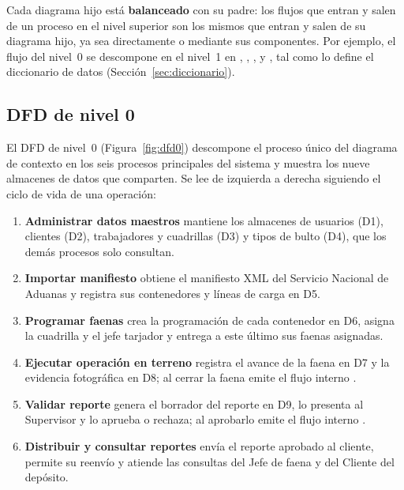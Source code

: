 Cada diagrama hijo está \textbf{balanceado} con su padre: los flujos que entran y salen de un
proceso en el nivel superior son los mismos que entran y salen de su diagrama hijo, ya sea
directamente o mediante sus componentes. Por ejemplo, el flujo 
del nivel~0 se descompone en el nivel~1 en , ,
,  y , tal como
lo define el diccionario de datos (Sección~\ref{sec:diccionario}).

\subsection{DFD de nivel 0}
\label{sec:dfd0}

El DFD de nivel~0 (Figura~\ref{fig:dfd0}) descompone el proceso único del diagrama de contexto
en los seis procesos principales del sistema y muestra los nueve almacenes de datos que
comparten. Se lee de izquierda a derecha siguiendo el ciclo de vida de una operación:

\begin{enumerate}
    \item \textbf{Administrar datos maestros} mantiene los almacenes de usuarios (D1), clientes
    (D2), trabajadores y cuadrillas (D3) y tipos de bulto (D4), que los demás procesos solo
    consultan.
    \item \textbf{Importar manifiesto} obtiene el manifiesto XML del Servicio Nacional de
    Aduanas y registra sus contenedores y líneas de carga en D5.
    \item \textbf{Programar faenas} crea la programación de cada contenedor en D6, asigna la
    cuadrilla y el jefe tarjador y entrega a este último sus faenas asignadas.
    \item \textbf{Ejecutar operación en terreno} registra el avance de la faena en D7 y la
    evidencia fotográfica en D8; al cerrar la faena emite el flujo interno .
    \item \textbf{Validar reporte} genera el borrador del reporte en D9, lo presenta al
    Supervisor y lo aprueba o rechaza; al aprobarlo emite el flujo interno .
    \item \textbf{Distribuir y consultar reportes} envía el reporte aprobado al cliente,
    permite su reenvío y atiende las consultas del Jefe de faena y del Cliente del depósito.
\end{enumerate}

